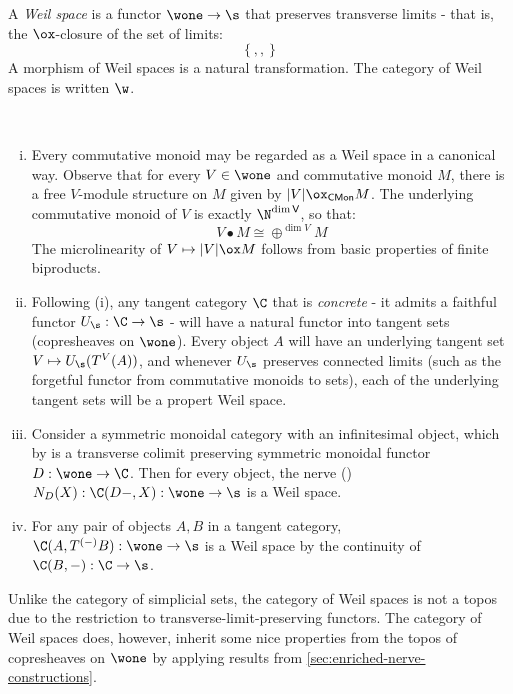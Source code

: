 \begin{definition}
	A \emph{Weil space} is a functor $\wone \to \s$ that preserves transverse limits - that is, the $\ox$-closure of the set of limits:
    \[
        \left\{
            
            ,
            
            ,
            
        \right\}
    \]  
	A morphism of Weil spaces is a natural transformation. The category of Weil spaces is written $\w$.
\end{definition}
\begin{example}
	~\begin{enumerate}[(i)]
		\item Every commutative monoid may be regarded as a Weil space in a canonical way.
		Observe that for every $V \in \wone$ and commutative monoid $M$, there is a free $V$-module structure on $M$ given by $|V| \ox_{\mathsf{CMon}} M$.
		The underlying commutative monoid of $V$ is exactly $\N^{\mathsf{\dim V}}$, so that:
		\[
			V \bullet M \cong \oplus^{\dim V} M 	
		\]
		The microlinearity of $V \mapsto |V| \ox M$ follows from basic properties of finite biproducts.
        \item Following (i), any tangent category $\C$ that is \emph{concrete} - it admits a faithful functor $U_\s: \C \to \s$ - will have a natural functor into tangent sets (copresheaves on $\wone$).
        Every object $A$ will have an underlying tangent set $V \mapsto U_{\s}(T^V(A))$, and whenever $U_\s$ preserves connected limits (such as the forgetful functor from commutative monoids to sets), each of the underlying tangent sets will be a propert Weil space.
		\item Consider a symmetric monoidal category with an infinitesimal object, which by  is a transverse colimit preserving symmetric monoidal functor $D:\wone \to \C$. Then for every object, the nerve () $N_D(X): \C(D-,X):\wone \to \s$ is a Weil space. 
		\item For any pair of objects $A,B$ in a tangent category, $\C(A,T^{(-)}B):\wone \to \s$ is a Weil space by the continuity of $\C(B,-):\C \to \s$.
	\end{enumerate}
\end{example}
Unlike the category of simplicial sets, the category of Weil spaces is not a topos due to the restriction to transverse-limit-preserving functors.
The category of Weil spaces does, however, inherit some nice properties from the topos of copresheaves on $\wone$ by applying results from \cref{sec:enriched-nerve-constructions}.
